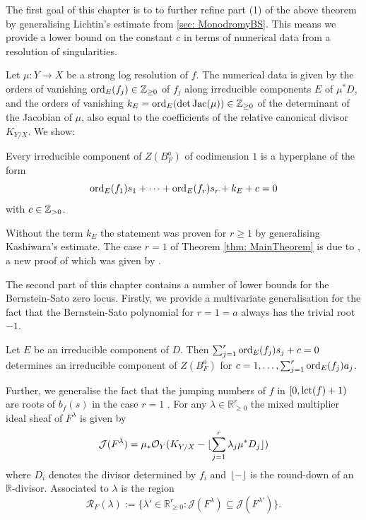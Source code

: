 The first goal of this chapter is to to further refine part (1) of the above theorem by generalising Lichtin's estimate from \cref{sec: MonodromyBS}.
This means we provide a lower bound on the constant $c$ in terms of numerical data from a resolution of singularities.

Let $\mu:Y\to X$ be a strong log resolution of $f$.
The numerical data is given by the orders of vanishing $\operatorname{ord}_{E}(f_j)\in\mathbb{Z}_{\geq 0}$ of $f_j$ along  irreducible components $E$ of $\mu^*D$, and the orders of vanishing $k_E=\operatorname{ord}_{E}(\det \operatorname{Jac}(\mu))\in\mathbb{Z}_{\geq 0}$ of the determinant of the Jacobian of $\mu$, also equal to the coefficients of the relative canonical divisor $K_{Y/X}$. We show:
\begin{theorem}\label{thm: MainTheorem}
  Every irreducible component of $Z(B_F^a)$ of codimension $1$ is a hyperplane of the form
  $$\operatorname{ord}_{E}(f_1)s_1 + \cdots + \operatorname{ord}_{E}(f_r)s_r + k_E + c=0 $$
with $c\in\mathbb{Z}_{>0}$.
\end{theorem}

Without the term $k_E$ the statement was proven for $r\ge 1$ by \cite[Lemma 4.4.6]{budur2020zeroII} generalising Kashiwara's estimate.
The case $r=1$ of Theorem \ref{thm: MainTheorem} is due to \cite{lichtin1989poles}, a new proof of which was given by \cite{DM}.

The second part of this chapter contains a number of lower bounds for the Bernstein-Sato zero locus.
Firstly, we provide a multivariate generalisation for the fact that the Bernstein-Sato polynomial for $r=1=a$ always has the trivial root $-1$.
\begin{proposition}
  Let $E$ be an irreducible component of $D$.
  Then $\sum_{j=1}^r \operatorname{ord}_{E}(f_j)s_j + c = 0$ determines an irreducible component of $Z(B_F^a)$ for $c = 1,\ldots, \sum_{j=1}^{r}\operatorname{ord}_{E}(f_j)a_j$.
\end{proposition}
Further, we generalise the fact that the jumping numbers of $f$ in $[0,\operatorname{lct}(f)+1)$ are roots of $b_{f}(s)$ in the case $r=1$ \cite[Theorem 2]{BSArbitraryVariety}.
For any $\lambda\in \mathbb{R}_{\geq 0}^r$ the mixed multiplier ideal sheaf of $F^\lambda$ is given by
$$\mathcal{J}(F^\lambda) = \mu_*\mathcal{O}_Y(K_{Y/X} - \lfloor \sum_{j=1}^r \lambda_j \mu^* D_j \rfloor)$$
where $D_i$ denotes the divisor determined by $f_i$ and $\lfloor {-} \rfloor$ is the round-down of an $\mathbb{R}$-divisor.
Associated to $\lambda$ is the region $$\mathcal{R}_F(\lambda):= \{\lambda'\in \mathbb{R}_{\geq 0}^r:\mathcal{J}(F^{\lambda}) \subseteq \mathcal{J}(F^{\lambda'})\}.$$

